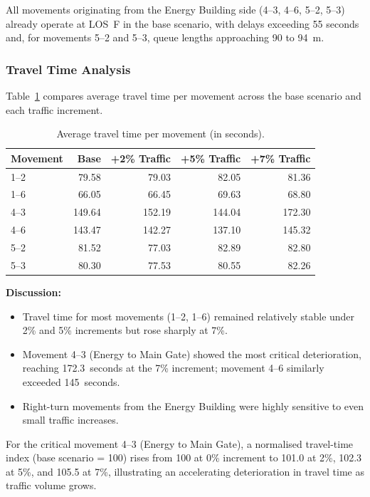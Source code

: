 \documentclass[11pt]{article}
\begin{document}
All movements originating from the Energy Building side (4--3, 4--6, 5--2, 5--3) already operate at
LOS~F in the base scenario, with delays exceeding 55 seconds and, for movements 5--2 and 5--3, queue
lengths approaching 90 to 94~m.

\subsubsection{Travel Time Analysis}
Table~\ref{tab:traveltime} compares average travel time per movement across the base scenario and each
traffic increment.

\begin{table}[H]
  \centering
  \small
  \caption{Average travel time per movement (in seconds).}
  \label{tab:traveltime}
  \begin{tabular}{@{}lrrrr@{}}
    \toprule
    \textbf{Movement} & \textbf{Base} & \textbf{+2\% Traffic} & \textbf{+5\% Traffic} & \textbf{+7\% Traffic} \\
    \midrule
    1--2 & 79.58  & 79.03  & 82.05  & 81.36 \\
    1--6 & 66.05  & 66.45  & 69.63  & 68.80 \\
    4--3 & 149.64 & 152.19 & 144.04 & 172.30 \\
    4--6 & 143.47 & 142.27 & 137.10 & 145.32 \\
    5--2 & 81.52  & 77.03  & 82.89  & 82.80 \\
    5--3 & 80.30  & 77.53  & 80.55  & 82.26 \\
    \bottomrule
  \end{tabular}
\end{table}

\textbf{Discussion:}
\begin{itemize}
  \item Travel time for most movements (1--2, 1--6) remained relatively stable under 2\% and 5\%
  increments but rose sharply at 7\%.
  \item Movement 4--3 (Energy to Main Gate) showed the most critical deterioration, reaching
  172.3~seconds at the 7\% increment; movement 4--6 similarly exceeded 145~seconds.
  \item Right-turn movements from the Energy Building were highly sensitive to even small traffic
  increases.
\end{itemize}
For the critical movement 4--3 (Energy to Main Gate), a normalised travel-time index (base scenario
= 100) rises from 100 at 0\% increment to 101.0 at 2\%, 102.3 at 5\%, and 105.5 at 7\%, illustrating an
accelerating deterioration in travel time as traffic volume grows.
\end{document}
